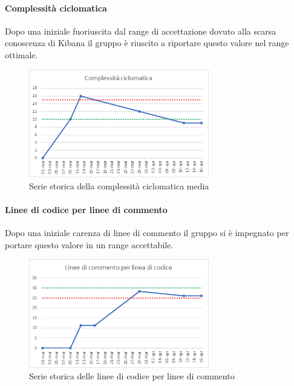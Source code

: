     \paragraph{Complessità ciclomatica} \Spazio
    Dopo una iniziale fuoriuscita dal range di accettazione dovuto alla scarsa conoscenza di Kibana il gruppo è riuscito a riportare questo valore nel range ottimale.
    \begin{figure}[H]
    	\centering 
    	\includegraphics[width=0.7\textwidth]{Images/ciclo.png}
    	\caption{Serie storica della complessità ciclomatica media}
    	\label{ciclo} 
    \end{figure}
    \paragraph{Linee di codice per linee di commento} \Spazio
    Dopo una iniziale carenza di linee di commento il gruppo si è impegnato per portare questo valore in un range accettabile.
    \begin{figure}[H]
    	\centering 
    	\includegraphics[width=0.7\textwidth]{Images/comm.png}
    	\caption{Serie storica delle linee di codice per linee di commento}
    	\label{comm} 
    \end{figure}
